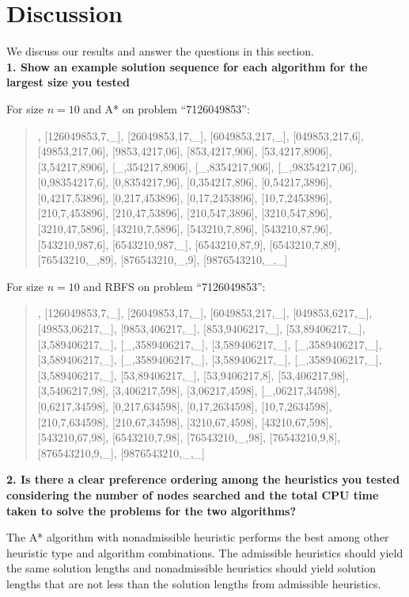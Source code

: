 \section{Discussion}\label{sec:dis}

We discuss our results and answer the questions in this section.\\

\textbf{1. Show an example solution sequence for each algorithm for the largest size you tested}

For size $n = 10$ and A* on problem ``7126049853'':

\begin{quote}
\noindent
[7126049853,\_,\_], [126049853,7,\_], [26049853,17,\_], [6049853,217,\_],
[049853,217,6], [49853,217,06], [9853,4217,06], [853,4217,906],
[53,4217,8906], [3,54217,8906], [\_,354217,8906], [\_,8354217,906],
[\_,98354217,06], [0,98354217,6], [0,8354217,96], [0,354217,896],
[0,54217,3896], [0,4217,53896], [0,217,453896], [0,17,2453896],
[10,7,2453896], [210,7,453896], [210,47,53896], [210,547,3896],
[3210,547,896], [3210,47,5896], [43210,7,5896], [543210,7,896],
[543210,87,96], [543210,987,6], [6543210,987,\_], [6543210,87,9],
[6543210,7,89], [76543210,\_,89], [876543210,\_,9], [9876543210,\_,\_]
\end{quote}

For size $n = 10$ and RBFS on problem ``7126049853'':

\begin{quote}
\noindent
[7126049853,\_,\_], [126049853,7,\_], [26049853,17,\_], [6049853,217,\_], 
[049853,6217,\_], [49853,06217,\_], [9853,406217,\_], [853,9406217,\_], 
[53,89406217,\_], [3,589406217,\_], [\_,3589406217,\_], [3,589406217,\_], 
[\_,3589406217,\_], [3,589406217,\_], [\_,3589406217,\_], [3,589406217,\_], 
[\_,3589406217,\_], [3,589406217,\_], [53,89406217,\_], [53,9406217,8], 
[53,406217,98], [3,5406217,98], [3,406217,598], [3,06217,4598], 
[\_,06217,34598], [0,6217,34598], [0,217,634598], [0,17,2634598], 
[10,7,2634598], [210,7,634598], [210,67,34598], [3210,67,4598], 
[43210,67,598], [543210,67,98], [6543210,7,98], [76543210,\_,98], 
[76543210,9,8], [876543210,9,\_], [9876543210,\_,\_] 
\end{quote}

\textbf{2. Is there a clear preference ordering among the heuristics you tested considering the number of nodes searched and the total CPU time taken to solve the problems for the two algorithms?}

The A* algorithm with nonadmissible heuristic performs the best among other heuristic type and algorithm combinations. The admissible heuristics should yield the same solution lengths and nonadmissible heuristics should yield solution lengths that are not less than the solution lengths from admissible heuristics.\\

